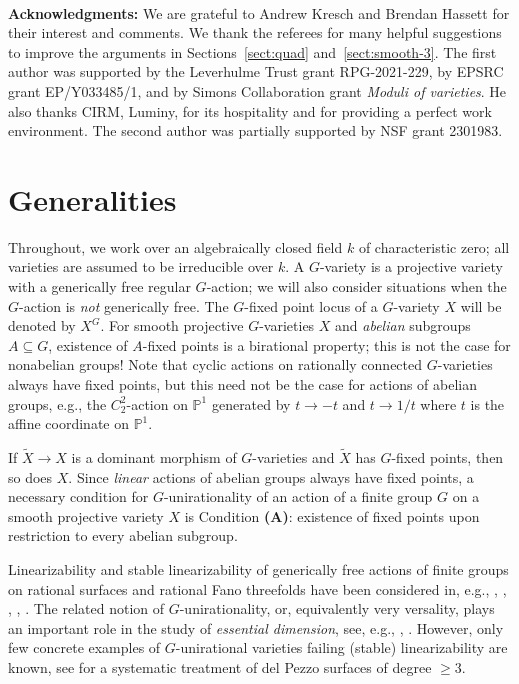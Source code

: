 \documentclass[12pt,reqno]{amsart}
\theoremstyle{plain}
\theoremstyle{remark}
\theoremstyle{definition}
\numberwithin{equation}{section}
\def\bP{{\mathbb P}}
\begin{document}
\

\noindent
{\bf Acknowledgments:} 
We are grateful to Andrew Kresch and Brendan Hassett for their interest and comments. We thank the referees for many helpful suggestions to improve the arguments in Sections~\ref{sect:quad} and~\ref{sect:smooth-3}.
The first author was supported by the Leverhulme Trust grant RPG-2021-229, by EPSRC grant EP/Y033485/1, and by Simons Collaboration grant \emph{Moduli of varieties}.
He also thanks CIRM, Luminy, for its hospitality and for
providing a perfect work environment. The second author was partially supported by NSF grant 2301983.





\section{Generalities}
\label{sect:gen}

Throughout, we work over an algebraically closed field $k$ of characteristic zero; all varieties are assumed to be irreducible over $k$. A $G$-variety is a projective variety with a generically free regular $G$-action; we will also consider situations when the $G$-action is {\em not} generically free. 
The $G$-fixed point locus of a $G$-variety $X$
will be denoted by $X^G$. For smooth projective $G$-varieties $X$ and {\em abelian} subgroups $A\subseteq G$, existence of $A$-fixed points is a birational property; this is not the case for nonabelian groups! Note that cyclic actions on rationally connected $G$-varieties always have fixed points, but this need not be the case for actions of abelian groups, e.g., the $C_2^2$-action on $\bP^1$ generated by $t\to -t$ and $t\to 1/t$ where $t$ is the affine coordinate on $\bP^1$. 

If $\tilde{X}\to X$ is a dominant morphism  of $G$-varieties and $\tilde{X}$ has $G$-fixed points, then so does $X$. Since {\em linear} actions of abelian groups always have fixed points, 
a necessary condition for $G$-unirationality of an action of a finite group $G$ on a smooth projective variety $X$ is Condition {\bf (A)}: existence of fixed points upon restriction to every abelian subgroup. 

Linearizability and stable linearizability of generically free actions of finite groups on rational surfaces and rational Fano threefolds have been considered in, e.g.,  \cite{HT-torsor}, \cite{BBT-der},  \cite{CTZ-burk}, \cite{CMTZ}, \cite{HT-quadric}. The related notion of $G$-unirationality, or, equivalently very versality, plays an important role in the study of {\em essential dimension}, see, e.g., \cite{DR}, \cite{Merkuriev}. However, only few concrete examples of $G$-unirational varieties failing (stable) linearizability are known, see \cite{Duncan} for a systematic treatment of del Pezzo surfaces of degree $\ge 3$. 
\end{document}
